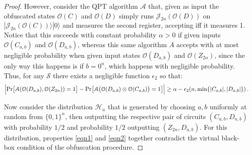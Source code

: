 \documentclass[11pt]{article}
\numberwithin{equation}{section}
\begin{document}
\begin{proof}
However, consider the QPT algorithm $\mathcal{A}$ that, given as input the obfuscated states $\mathcal{O}(C)$ and $\mathcal{O}(D)$ simply runs $\mathcal{J}_{2n}(\mathcal{O}(D))$ on $|\mathcal{J}_{2n}(\mathcal{O}(C))\rangle|0\rangle$ and measures the second register, accepting iff it measures 1.  Notice that this succeeds with constant probability $\alpha>0$ if given inputs $\mathcal{O}(C_{a,b})$ and $\mathcal{O}(D_{a,b})$, whereas this same algorithm $A$ accepts with at most negligible probability when given input states $\mathcal{O}(D_{a,b})$ and $\mathcal{O}(Z_{2n})$, since the only way this happens is if $b=0^n$, which happens with negligible probability.  
Thus, for any $\mathcal S$ there exists a negligible function $\epsilon_2$ so that:
\begin{equation}\label{eqn2}\Bigl| \text{Pr}\bigl[\mathcal A(\mathcal{O}(D_{a,b}),\mathcal{O}(Z_{2n})) = 1\bigr]- \text{Pr}\bigl[\mathcal A\bigl(\mathcal{O}(D_{a,b})\otimes\mathcal{O}(C_{a,b})\bigr) = 1\bigr] \Bigr| \geq \alpha-\epsilon_2(n,\min\{|C_{a,b}|,|D_{a,b}|\})\,.\end{equation}

Now consider the distribution $\mathcal{H}_n$ that is generated by choosing $a,b$ uniformly at random from $\{0,1\}^n$, then outputting the respective pair of circuits $(C_{a,b},D_{a,b})$ with probability $1/2$ and probability $1/2$ outputting $(Z_{2n},D_{a,b})$.  For this distribution, properties \ref{eqn1} and \ref{eqn2} together contradict the virtual black-box condition of the obfuscation procedure.
\end{proof}
\end{document}
